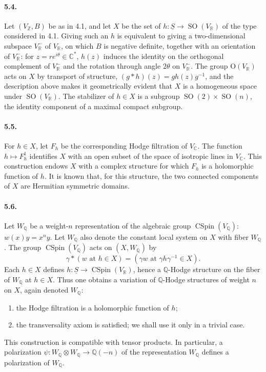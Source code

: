 \documentclass[10pt]{article}
\newcommand{\C}{\mathbb{C}}
\newcommand{\Q}{\mathbb{Q}}
\newcommand{\R}{\mathbb{R}}
\newcommand{\Z}{\mathbb{Z}}
\newcommand{\SO}{\operatorname{SO}}
\newcommand{\CSpin}{\operatorname{CSpin}}
\begin{document}
\paragraph{5.4.} Let $(V_\Z,B)$ be as in 4.1, and let $X$ be the set of $h:\underline S\to\SO(V_\R)$ of the type considered in 4.1. Giving such an $h$ is equivalent to giving a two-dimensional subspace $V^-_\R$ of $V_\R$, on which $B$ is negative definite, together with an orientation of $V^-_\R$: for $z=re^{i\theta}\in\C^*$, $h(z)$ induces the identity on the orthogonal complement of $V^-_\R$ and the rotation through angle $2\theta$ on $V^-_\R$. The group $\mathrm O(V_\R)$ acts on $X$ by transport of structure, $(g*h)(z)=gh(z)g^{-1}$, and the description above makes it geometrically evident that $X$ is a homogeneous space under $\SO(V_\R)$. The stabilizer of $h\in X$ is a subgroup $\SO(2)\times\SO(n)$, the identity component of a maximal compact subgroup.

\paragraph{5.5.} For $h\in X$, let $F_h$ be the corresponding Hodge filtration of $V_\C$. The function $h\mapsto F_h^1$ identifies $X$ with an open subset of the space of isotropic lines in $V_\C$. This construction endows $X$ with a complex structure for which $F_h$ is a holomorphic function of $h$. It is known that, for this structure, the two connected components of $X$ are Hermitian symmetric domains.

\paragraph{5.6.} Let $W_\Q$ be a weight-$n$ representation of the algebraic group $\CSpin(V_\Q)$: $w(x)y=x^n y$. Let $W_\Q$ also denote the constant local system on $X$ with fiber $W_\Q$. The group $\CSpin(V_\Q)$ acts on $(X,W_\Q)$ by
\[
\gamma*(w\text{ at }h\in X)=(\gamma w\text{ at }\gamma h\gamma^{-1}\in X).
\]
Each $h\in X$ defines $h:\underline S\to\CSpin(V_\R)$, hence a $\Q$-Hodge structure on the fiber of $W_\Q$ at $h\in X$. Thus one obtains a variation of $\Q$-Hodge structures of weight $n$ on $X$, again denoted $W_\Q$:
\begin{enumerate}[label=\alph*)]
\item the Hodge filtration is a holomorphic function of $h$;
\item the transversality axiom is satisfied; we shall use it only in a trivial case.
\end{enumerate}
This construction is compatible with tensor products. In particular, a polarization $\psi:W_\Q\otimes W_\Q\to\Q(-n)$ of the representation $W_\Q$ defines a polarization of $W_\Q$.
\end{document}
